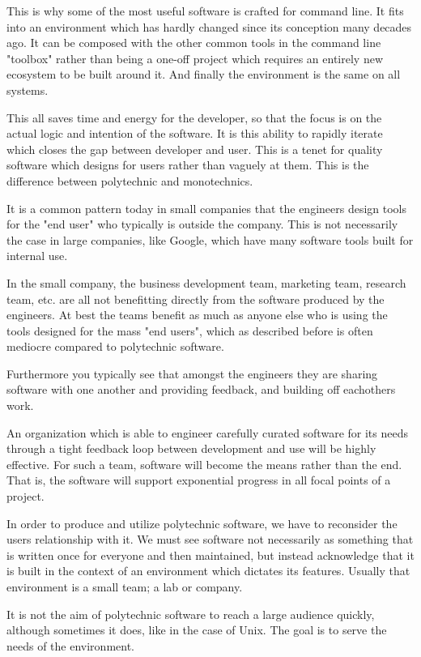 This is why some of the most useful software is crafted for command line. It
fits into an environment which has hardly changed since its conception many
decades ago. It can be composed with the other common tools in the command line
"toolbox" rather than being a one-off project which requires an entirely new
ecosystem to be built around it. And finally the environment is the same on all
systems.

This all saves time and energy for the developer, so that the focus is on the
actual logic and intention of the software. It is this ability to rapidly
iterate which closes the gap between developer and user. This is a tenet for
quality software which designs for users rather than vaguely at them. This is
the difference between polytechnic and monotechnics.

It is a common pattern today in small companies that the engineers design tools
for the "end user" who typically is outside the company. This is not
necessarily the case in large companies, like Google, which have many software
tools built for internal use.

In the small company, the business development team, marketing team, research
team, etc. are all not benefitting directly from the software produced by the
engineers. At best the teams benefit as much as anyone else who is using the
tools designed for the mass "end users", which as described before is often
mediocre compared to polytechnic software.

Furthermore you typically see that amongst the engineers they are sharing
software with one another and providing feedback, and building off eachothers work.

An organization which is able to engineer carefully curated software for its
needs through a tight feedback loop between development and use will be highly
effective. For such a team, software will become the means rather than the end.
That is, the software will support exponential progress in all focal points of a
project.

In order to produce and utilize polytechnic software, we have to reconsider the
users relationship with it. We must see software not necessarily as
something that is written once for everyone and then maintained, but instead
acknowledge that it is built in the context of an environment which dictates its
features. Usually that environment is a small team; a lab or company.

It is not the aim of polytechnic software to reach a large audience quickly,
although sometimes it does, like in the case of Unix. The goal is to serve the
needs of the environment.

